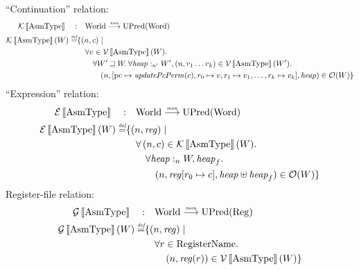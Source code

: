 \documentclass{article}
\newcommand{\update}[2]{[#1 \mapsto #2]}
\newcommand{\sem}[1]{\left\llbracket #1 \right\rrbracket}
\newcommand{\monfun}{\stackrel{\textit{\tiny{mon}}}{\longrightarrow}}
\newcommand{\defeq}{\stackrel{\textit{\tiny{def}}}{=}}
\newcommand{\var}[1]{\mathit{#1}}
\newcommand{\pcreg}{\mathrm{pc}}
\newcommand{\reg}{\var{reg}}
\newcommand{\heap}{\var{heap}}
\newcommand{\plainfun}[1]{\mathit{#1}}
\newcommand{\updatePcPerm}[1]{\plainfun{updatePcPerm}(#1)}
\newcommand{\future}{\mathbin{\sqsupseteq}}
\newcommand{\heapSat}[3][\heap]{#1 :_{#2} #3}
\newcommand{\asmType}{\plaindom{AsmType}}
\newcommand{\plaindom}[1]{\mathrm{#1}}
\newcommand{\Words}{\plaindom{Word}}
\newcommand{\RegName}{\plaindom{RegisterName}}
\newcommand{\Regs}{\plaindom{Reg}}
\newcommand{\Worlds}{\plaindom{World}}
\newcommand{\UPred}[1]{\plaindom{UPred}(#1)}
\newcommand{\intr}[2]{\mathcal{#1}\sem{#2}}
\newcommand{\valueintr}[1]{\intr{V}{#1}}
\newcommand{\exprintr}[1]{\intr{E}{#1}}
\newcommand{\contintr}[1]{\intr{K}{#1}}
\newcommand{\envintr}[1]{\intr{G}{#1}}
\newcommand{\stdvr}{\valueintr{\asmType}}
\newcommand{\stder}{\exprintr{\asmType}}
\newcommand{\stdgr}{\envintr{\asmType}}
\newcommand{\stdkr}{\contintr{\asmType}}
\newcommand{\observations}{\mathcal{O}}
\newcommand{\npair}[2][n]{\left(#1,#2 \right)}
\begin{document}
``Continuation'' relation:
\begin{align*}
  \stdkr \quad : & \quad  \Worlds \monfun \UPred{\Words} \\%
  \stdkr(W) \defeq & \{ \npair{c} \mid \\
                   & \quad \forall v \in \stdvr(W)\ldotp \\
                   & \qquad  \forall W' \future W\ldotp %
                     \forall \heapSat[\heap]{n'}{W'}, \npair{v_1 \dots v_k} \in \stdvr(W') \ldotp \\
                   & \qquad \quad (n,[\pcreg \mapsto \updatePcPerm{c},r_0 \mapsto v,r_1 \mapsto v_1,\dots, r_k \mapsto v_k], \heap) \in \observations(W) \}
\end{align*}
``Expression'' relation:
\begin{align*}
  \stder \quad : & \quad \Worlds \monfun \UPred{\Words} \\%
  \stder(W) \defeq & \{ \npair{\reg} \mid \\
                   & \quad \forall \npair{c} \in \stdkr(W) \ldotp \\
                   & \qquad  \forall \heapSat[\heap]{n}{W}, \heap_f \ldotp \\
                   & \qquad \quad (n,\reg\update{r_0}{c},\heap \uplus \heap_f) \in \observations(W) \}
\end{align*}
Register-file relation:
\begin{align*}
  \stdgr \quad : & \quad \Worlds \monfun \UPred{\Regs} \\
  \stdgr(W) \defeq & \{ \npair{\reg} \mid \\
                    & \quad \forall r \in \RegName \ldotp \\
                    & \qquad  \npair{\reg(r)} \in \stdvr(W) \}
\end{align*}
\end{document}
